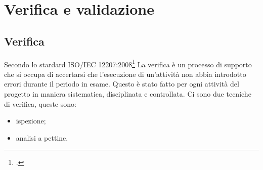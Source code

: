 
\chapter{Verifica e validazione}
\label{cap:verifica-validazione}
\section{Verifica}
Secondo lo stardard ISO/IEC 12207:2008\footcite{ISO:Systems-and-software-engineering} La verifica è un processo di supporto che si occupa di accertarsi che l’esecuzione di un'attività non abbia introdotto errori durante il periodo in esame. Questo è stato fatto per ogni attività del progetto in maniera sistematica, disciplinata e controllata. Ci sono due tecniche di verifica, queste sono:
\begin{itemize}
    \item ispezione;
    \item analisi a pettine.
\end{itemize}
